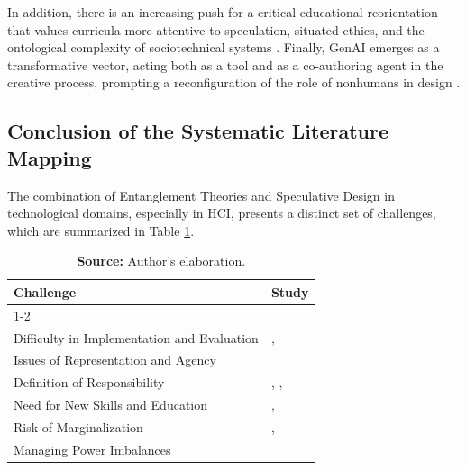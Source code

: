 In addition, there is an increasing push for a critical educational reorientation that values curricula more attentive to speculation, situated ethics, and the ontological complexity of sociotechnical systems \cite{forlano2023speculative, bekker2023challenges}. Finally, GenAI emerges as a transformative vector, acting both as a tool and as a co-authoring agent in the creative process, prompting a reconfiguration of the role of nonhumans in design \cite{tholander2023design}. 


\subsection{Conclusion of the Systematic Literature Mapping}

The combination of Entanglement Theories and Speculative Design in technological domains, especially in HCI, presents a distinct set of challenges, which are summarized in Table \ref{tab:limites_emaranhado_de}.


\begin{table}[ht!]
\centering
\scriptsize
\caption{Challenges in Integrating Entanglement Theories and Speculative Design}
\begin{tabular}{p{6cm}p{9cm}}

\toprule
\multicolumn{1}{l}{\textbf{Challenge}} & 
\multicolumn{1}{l}{\textbf{Study}} \\
\cmidrule[0.4pt]{1-2}

\multicolumn{1}{l}{Complexity and Abstraction} & 
\cite{bekker2023challenges} \\

\multicolumn{1}{l}{Difficulty in Implementation and Evaluation} & 
\cite{kimura2022designing}, \cite{forlano2023speculative} \\

\multicolumn{1}{l}{Issues of Representation and Agency} & 
\cite{bekker2023challenges} \\

\multicolumn{1}{l}{Definition of Responsibility} & 
\cite{staahl2022making}, \cite{bekker2023challenges}, \cite{homewood2021tracing} \\

\multicolumn{1}{l}{Need for New Skills and Education} & 
\cite{forlano2023speculative}, \cite{homewood2021tracing} \\

\multicolumn{1}{l}{Risk of Marginalization} & 
\cite{forlano2023speculative}, \cite{henry2024theorizing} \\

\multicolumn{1}{l}{Managing Power Imbalances} & 
\cite{benjamin2023entoptic} \\

\bottomrule
\end{tabular}
\label{tab:limites_emaranhado_de}
\caption*{\textbf{Source:} Author’s elaboration.}
\end{table}

